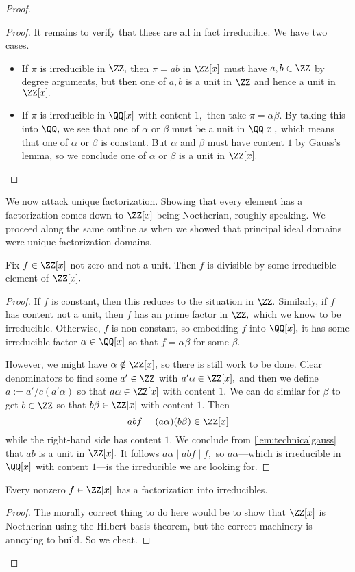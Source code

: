 \begin{proof}
\begin{proof}
		It remains to verify that these are all in fact irreducible. We have two cases.
		\begin{itemize}
			\item If $\pi$ is irreducible in $\ZZ,$ then $\pi=ab$ in $\ZZ[x]$ must have $a,b\in\ZZ$ by degree arguments, but then one of $a,b$ is a unit in $\ZZ$ and hence a unit in $\ZZ[x].$
			\item If $\pi$ is irreducible in $\QQ[x]$ with content $1,$ then take $\pi=\alpha\beta.$ By taking this into $\QQ,$ we see that one of $\alpha$ or $\beta$ must be a unit in $\QQ[x],$ which means that one of $\alpha$ or $\beta$ is constant. But $\alpha$ and $\beta$ must have content $1$ by Gauss's lemma, so we conclude one of $\alpha$ or $\beta$ is a unit in $\ZZ[x].$
			\qedhere
		\end{itemize}
	\end{proof}
	We now attack unique factorization. Showing that every element has a factorization comes down to $\ZZ[x]$ being Noetherian, roughly speaking. We proceed along the same outline as when we showed that principal ideal domains were unique factorization domains.
	\begin{lemma}
		Fix $f\in\ZZ[x]$ not zero and not a unit. Then $f$ is divisible by some irreducible element of $\ZZ[x].$
	\end{lemma}
	\begin{proof}
		If $f$ is constant, then this reduces to the situation in $\ZZ.$ Similarly, if $f$ has content not a unit, then $f$ has an prime factor in $\ZZ,$ which we know to be irreducible. Otherwise, $f$ is non-constant, so embedding $f$ into $\QQ[x],$ it has some irreducible factor $\alpha\in\QQ[x]$ so that $f=\alpha\beta$ for some $\beta.$
		
		However, we might have $\alpha\notin\ZZ[x],$ so there is still work to be done. Clear denominators to find some $a'\in\ZZ$ with $a'\alpha\in\ZZ[x],$ and then we define $a:=a'/c(a'\alpha)$ so that $a\alpha\in\ZZ[x]$ with content $1.$ We can do similar for $\beta$ to get $b\in\ZZ$ so that $b\beta\in\ZZ[x]$ with content $1.$ Then
		\[abf=(a\alpha)(b\beta)\in\ZZ[x]\]
		while the right-hand side has content $1.$ We conclude from \autoref{lem:technicalgauss} that $ab$ is a unit in $\ZZ[x].$ It follows $a\alpha\mid abf\mid f,$ so $a\alpha$---which is irreducible in $\QQ[x]$ with content $1$---is the irreducible we are looking for.
	\end{proof}
	\begin{lemma}
		Every nonzero $f\in\ZZ[x]$ has a factorization into irreducibles.
	\end{lemma}
	\begin{proof}
		The morally correct thing to do here would be to show that $\ZZ[x]$ is Noetherian using the Hilbert basis theorem, but the correct machinery is annoying to build. So we cheat.


\end{proof}
\end{proof}
